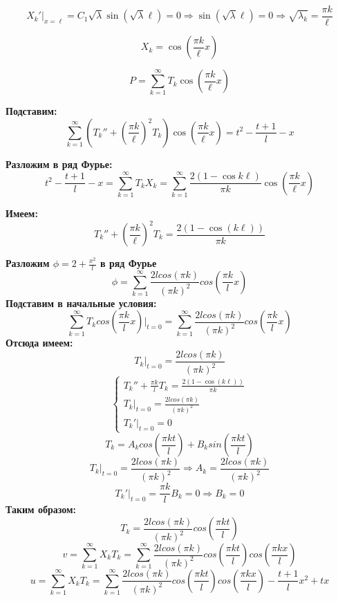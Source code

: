 \documentclass[a4paper,12pt]{article}
\begin{document}
$$X_k'|_{x = \ell} = C_1 \sqrt{\lambda} \sin(\sqrt{\lambda} \ell) = 0 \Rightarrow \sin(\sqrt{\lambda} \ell) = 0 \Rightarrow \sqrt{\lambda_k} = \frac{\pi k}{\ell}$$

$$X_k = \cos\left( \frac{\pi k}{\ell} x \right)$$

$$P = \sum_{k=1}^{\infty} T_k \cos\left( \frac{\pi k}{\ell} x \right)$$

\textbf{Подставим:}
$$\sum_{k=1}^{\infty} \left( T_k'' + \left( \frac{\pi k}{\ell} \right)^2 T_k \right) \cos\left( \frac{\pi k}{\ell} x \right) = t^2 - \frac{t+1}{l} - x$$

\textbf{Разложим в ряд Фурье:}
$$t^2 - \frac{t+1}{l} - x = \sum_{k=1}^{\infty} T_k X_k = \sum_{k=1}^{\infty} \frac{2(1 - \cos k \ell)}{\pi k} \cos\left( \frac{\pi k}{\ell} x \right)$$

\textbf{Имеем:}
$$T_k'' + \left( \frac{\pi k}{\ell} \right)^2 T_k = \frac{2(1 - \cos(k \ell))}{\pi k}$$

\textbf{Разложим $\phi = 2 + \frac{x^2}{l}$ в ряд Фурье}
$$\phi = \sum_{k=1}^{\infty}\frac{2lcos(\pi k)}{(\pi k)^2}cos(\frac{\pi k}{l}x)$$
\textbf{Подставим в начальные условия:}
$$\sum_{k=1}^{\infty}T_k cos(\frac{\pi k}{l}x)|_{t=0} = \sum_{k=1}^{\infty}\frac{2lcos(\pi k)}{(\pi k)^2}cos(\frac{\pi k}{l}x)$$
\textbf{Отсюда имеем:}
$$T_k|_{t=0} = \frac{2l cos(\pi k)}{(\pi k)^2}$$
$$
\begin{cases}
    T_k'' + \frac{\pi k}{l}T_k = \frac{2(1 - \cos(k \ell))}{\pi k} \\
    T_k|_{t=0} = \frac{2l cos(\pi k)}{(\pi k)^2} \\
    T_k'|_{t=0} = 0
\end{cases}
$$
$$T_k = A_k cos(\frac{\pi kt}{l}) + B_k sin(\frac{\pi kt}{l})$$
$$T_k |_{t=0} = \frac{2l cos(\pi k)}{(\pi k)^2} \Rightarrow A_k = \frac{2l cos(\pi k)}{(\pi k)^2}$$
$$T_k' |_{t=0} = \frac{\pi k}{l}B_k = 0 \Rightarrow B_k = 0$$
\textbf{Таким образом:}
$$T_k = \frac{2l cos(\pi k)}{(\pi k)^2}cos(\frac{\pi k t}{l})$$
$$v = \sum_{k=1}^{\infty}X_k T_k = \sum_{k=1}^{\infty} \frac{2l cos(\pi k)}{(\pi k)^2}cos(\frac{\pi k t}{l})cos(\frac{\pi k x}{l})$$
$$u = \sum_{k=1}^{\infty}X_k T_k = \sum_{k=1}^{\infty} \frac{2l cos(\pi k)}{(\pi k)^2}cos(\frac{\pi k t}{l})cos(\frac{\pi k x}{l}) - \frac{t+1}{l}x^2 + tx$$
\end{document}
